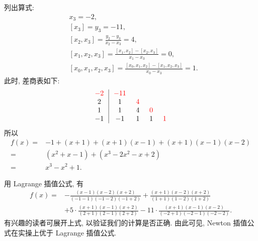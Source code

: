 \begin{example}
    列出算式:
    \begin{align*}
         & x_3 = -2,                                                                       \\
         & [x_3] = y_3 = -11,                                                              \\
         & [x_2, x_3] = \frac{y_2 - y_3}{x_2 - x_3} = 4,                                   \\
         & [x_1, x_2, x_3] = \frac{[x_1, x_2] - [x_2, x_3]}{x_1 - x_3} = 0,                \\
         & [x_0, x_1, x_2, x_3] = \frac{[x_0, x_1, x_2] - [x_1, x_2, x_3]}{x_0 - x_3} = 1.
    \end{align*}
    此时, 差商表如下:
    \begin{align*}
        \arraycolsep=0.25cm
        \begin{array}{c|cccc}
            \textcolor{red}{-2} & \textcolor{red}{-11} & \                  & \                  & \                  \\
            2                   & 1                    & \textcolor{red}{4} & \                  & \                  \\
            1                   & 1                    & 4                  & \textcolor{red}{0} & \                  \\
            -1                  & -1                   & 1                  & 1                  & \textcolor{red}{1} \\
        \end{array}
    \end{align*}
    所以
    \begin{align*}
        f(x)
        = {} & -1 + (x + 1) + (x + 1)(x - 1) + (x + 1)(x - 1)(x - 2) \\
        = {} & (x^2 + x - 1) + (x^3 - 2x^2 - x + 2)                  \\
        = {} & x^3 - x^2 + 1.
    \end{align*}

    用 Lagrange 插值公式, 有
    \begin{align*}
        f(x)
        = {} & - \frac{(x-1)(x-2)(x+2)}{(-1-1)(-1-2)(-1+2)} + \frac{(x+1)(x-2)(x+2)}{(1+1)(1-2)(1+2)}                   \\
             & + 5 \cdot \frac{(x+1)(x-1)(x+2)}{(2+1)(2-1)(2+2)} - 11 \cdot \frac{(x+1)(x-1)(x-2)}{(-2+1)(-2-1)(-2-2)}.
    \end{align*}
    有兴趣的读者可展开上式, 以验证我们的计算是否正确. 由此可见, Newton 插值公式在实操上优于 Lagrange 插值公式.
\end{example}

